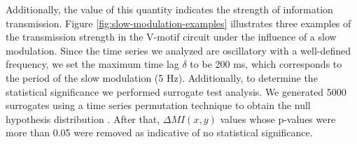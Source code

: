 \documentclass[../main.tex]{subfiles}
\begin{document}
Additionally, the value of this quantity indicates the strength of information transmission.
Figure \ref{fig:slow-modulation-examples} illustrates three examples of the transmission strength in the V-motif circuit under the influence of a slow modulation.
Since the time series we analyzed are oscillatory with a well-defined frequency, 
we set the maximum time lag $\delta$ to be 200 ms, which corresponds to the period of the slow modulation (5 Hz).
Additionally, to determine the statistical significance we performed surrogate test analysis.
We generated 5000 surrogates using a time series permutation technique to obtain the null hypothesis distribution \citep{cohen2014analyzing}.
After that, $\Delta MI(x,y)$ values whose p-values were more than 0.05 were removed as indicative of no statistical significance.
\end{document}
